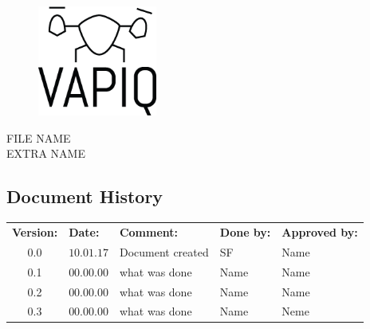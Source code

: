 \documentclass{article}
\author{Tomas Lyngroth \\ Aleksander Holthe \\ Vanja Katinka Halvorsen \\ Stian Fredriksen \\ Kent Kjeldaas \\ Katrine Sundal Haune}
\makeatletter
\let\vapiqteam\@author
\makeatother
\begin{document}
\begin{titlepage}
    \centering
    \pagecolor{gainsboro}
	\\[3.0 cm]
    \begin{figure}[h]
        \centering
        \includegraphics[width = 0.35\textwidth]{VAPIQ-PICTURES//Logo2_Tilted.png}
        \\[2.0 cm] 
    \end{figure}                              
    \textsc{\Huge FILE NAME}  
    \\[1 cm]
    \textsc{\Large EXTRA NAME}   
    \\[3.0 cm]
	\large \vapiqteam      
\end{titlepage}
\pagecolor{white}


\begin{center}
\section*{\textbf{Document History}}
\begin{tabular}{cllll}
\rowcolor{cadetgrey}
\textbf{Version:}    &\textbf{Date:} 	 &\textbf{Comment:}    &\textbf{Done by:}   &\textbf{Approved by:}  \\

0.0       & $10.01.17$       & Document created  & SF    & Name          \\ \rowcolor{gainsboro}
0.1       & $00.00.00$       & what was done  & Name    & Name          \\
0.2       & $00.00.00$       & what was done  & Name    & Name          \\ \rowcolor{gainsboro}
0.3       & $00.00.00$       & what was done  & Name    & Neme          \\
\end{tabular}                                                                   
\end{center}
\end{document}
